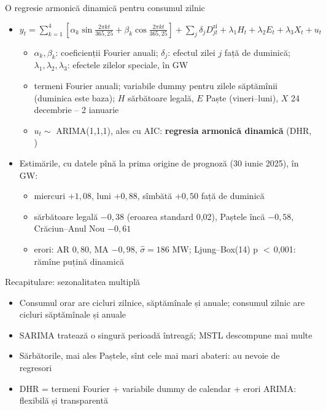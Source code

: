 \begin{frame}{O regresie armonică dinamică pentru consumul zilnic}
\itemsize{\footnotesize}
\begin{itemize}
    \item $y_t = \sum_{k=1}^{4}\left[\alpha_k\sin\frac{2\pi kt}{365{,}25} + \beta_k\cos\frac{2\pi kt}{365{,}25}\right] + \sum_{j}\delta_jD^{\mathrm{zi}}_{jt} + \lambda_1H_t + \lambda_2E_t + \lambda_3X_t + u_t$
    \begin{itemize}
        \item $\alpha_k, \beta_k$: coeficienții Fourier anuali; $\delta_j$: efectul zilei $j$ față de duminică; $\lambda_1, \lambda_2, \lambda_3$: efectele zilelor speciale, în GW
        \item termeni Fourier anuali; variabile dummy pentru zilele săptămînii (duminica este baza); $H$ sărbătoare legală, $E$ Paște (vineri--luni), $X$ 24 decembrie -- 2 ianuarie
        \item $u_t \sim$ ARIMA(1,1,1), ales cu AIC: \textbf{regresia armonică dinamică} (DHR, )
    \end{itemize}
    \item Estimările, cu datele pînă la prima origine de prognoză (30 iunie 2025), în GW:
    \begin{itemize}
        \item miercuri $+1{,}08$, luni $+0{,}88$, sîmbătă $+0{,}50$ față de duminică
        \item sărbătoare legală $-0{,}38$ (eroarea standard 0{,}02), Paștele încă $-0{,}58$, Crăciun--Anul Nou $-0{,}61$
        \item erori: AR $0{,}80$, MA $\ensuremath{-}0{,}98$, $\hat\sigma = 186$ MW; Ljung--Box(14) p $<$\,0{,}001: rămîne puțină dinamică
    \end{itemize}
\end{itemize}
\end{frame}

\begin{frame}{Recapitulare: sezonalitatea multiplă}
\itemsize{\small}
\begin{itemize}
    \item Consumul orar are cicluri zilnice, săptămînale și anuale; consumul zilnic are cicluri săptămînale și anuale
    \item SARIMA tratează o singură perioadă întreagă; MSTL descompune mai multe
    \item Sărbătorile, mai ales Paștele, sînt cele mai mari abateri: au nevoie de regresori
    \item DHR = termeni Fourier + variabile dummy de calendar + erori ARIMA: flexibilă și transparentă
\end{itemize}
\end{frame}


